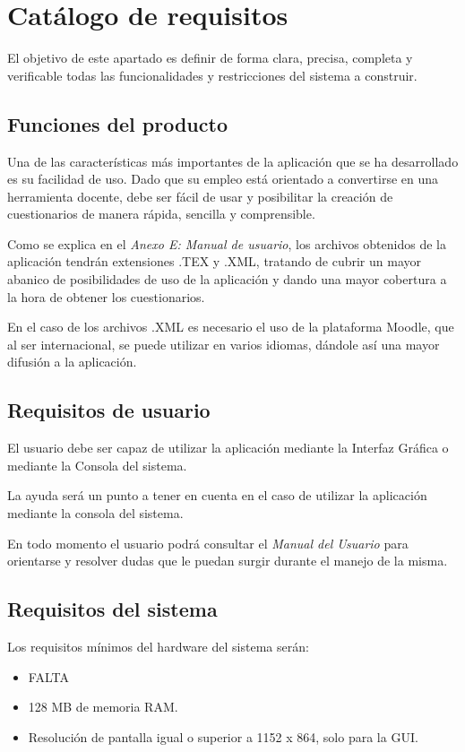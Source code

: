 \section{Catálogo de requisitos}
El objetivo de este apartado es definir de forma clara, precisa, completa y verificable todas las funcionalidades y restricciones del sistema a construir.

\subsection{Funciones del producto}
Una de las características más importantes de la aplicación que se ha  desarrollado es su facilidad de uso. 
Dado que su empleo está orientado a convertirse en una herramienta docente, debe ser fácil de usar y posibilitar la creación de cuestionarios de manera rápida, sencilla y comprensible.

Como se explica en el \textit{Anexo E: Manual de usuario}, los archivos obtenidos de la aplicación tendrán extensiones .TEX y .XML, tratando de cubrir un mayor abanico de posibilidades de uso de la aplicación y dando una mayor cobertura a la hora de obtener los cuestionarios.

En el caso de los archivos .XML es necesario el uso de la plataforma Moodle, que al ser internacional, se puede utilizar en varios idiomas, dándole así una mayor difusión a la aplicación.

\subsection{Requisitos de usuario}
El usuario debe ser capaz de utilizar la aplicación mediante la Interfaz Gráfica o mediante la Consola del sistema. 

La ayuda será un punto a tener en cuenta en el caso de utilizar la aplicación mediante la consola del sistema.
 
En todo momento el usuario podrá consultar el \textit{Manual del Usuario} para
orientarse y resolver dudas que le puedan surgir durante el manejo de la misma.

\subsection{Requisitos del sistema}
Los requisitos mínimos del hardware del sistema serán:



\begin{itemize}



\item FALTA
\item 128 MB  de memoria RAM.
\item Resolución de pantalla igual o superior a 1152 x 864, solo para la GUI.
\end{itemize}


